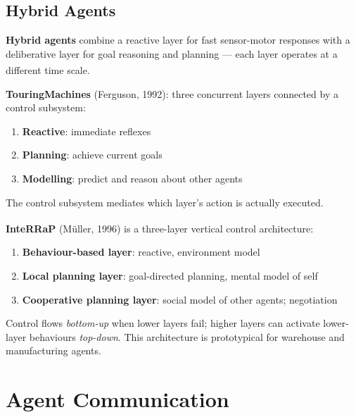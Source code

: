 \subsection{Hybrid Agents}
\begin{tcbitemize}[ skin=sectionraster ]

    \tcbitem[title=Layered Hybrid Architectures, raster multicolumn=3]
    \textbf{Hybrid agents} combine a reactive layer for fast sensor-motor responses
    with a deliberative layer for goal reasoning and planning --- each layer
    operates at a different time
    scale.\textsuperscript{\cite[][p.~71]{wooldridgeIntroductionMultiAgentSystems2009}}

    \textbf{TouringMachines} (Ferguson, 1992): three concurrent layers
    connected by a control subsystem:
    \begin{enumerate}
        \item \textbf{Reactive}: immediate reflexes
        \item \textbf{Planning}: achieve current goals
        \item \textbf{Modelling}: predict and reason about other agents
    \end{enumerate}
    The control subsystem mediates which layer's action is actually executed.

    \tcbitem[title=InteRRaP Architecture, raster multicolumn=3]
    \textbf{InteRRaP} (Müller, 1996) is a three-layer vertical control
    architecture:\textsuperscript{\cite[][p.~72]{wooldridgeIntroductionMultiAgentSystems2009}}

    \begin{enumerate}
        \item \textbf{Behaviour-based layer}: reactive, environment model
        \item \textbf{Local planning layer}: goal-directed planning, mental model of self
        \item \textbf{Cooperative planning layer}: social model of other agents; negotiation
    \end{enumerate}
    Control flows \emph{bottom-up} when lower layers fail; higher layers can
    activate lower-layer behaviours \emph{top-down}.
    This architecture is prototypical for warehouse and manufacturing agents.

\end{tcbitemize}

\section{Agent Communication}

